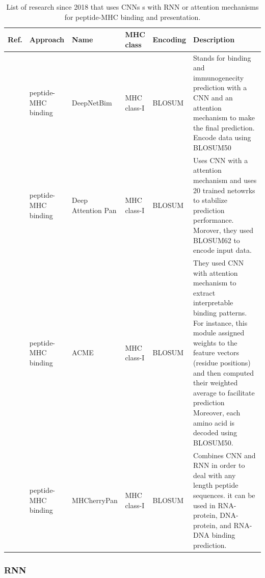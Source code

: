 \begin{table}[]
	\caption{List of research since 2018 that uses CNNs s with RNN or attention mechanisms for peptide-MHC binding and presentation.}
	\label{tab:cnn2}
	\setlength{\tabcolsep}{0.5em} %
	{\renewcommand{\arraystretch}{1.2}%
		
		\begin{tabular}{p{1.3cm}p{1.6cm}p{2cm}p{1.6cm}p{1.9cm}p{4cm}}
			\textbf{Ref.}                              & \textbf{Approach}   & \textbf{Name}    & \textbf{MHC class} & \textbf{Encoding} & \textbf{Description}                                            \\ \hline
			         \cite{yang2021deepnetbim} & peptide-MHC binding & DeepNetBim       & MHC class-I        & BLOSUM            & Stands for binding and immunogenecity prediction with a CNN and an attention mechanism to make the final prediction. Encode data using BLOSUM50         \\
			
			           \cite{jin2021deep}        & peptide-MHC binding & Deep Attention Pan & MHC class-I        & BLOSUM            & Uses CNN with a attention mechanism and uses 20 trained netowrks to stabilize prediction performance. Morover, they used BLOSUM62 to encode input data.            \\
			
			           \cite{hu2019acme}         & peptide-MHC binding & ACME             & MHC class-I        & BLOSUM     & They used CNN with attention mechanism to extract interpretable binding patterns. For instance, this module assigned  weights to the feature vectors (residue positions) and then computed their weighted average to facilitate prediction Moreover, each amino acid is decoded using BLOSUM50.  \\
			
			           \cite{xie2020mhcherrypan} & peptide-MHC binding & MHCherryPan      & MHC class-I        & BLOSUM            & Combines CNN and RNN in order to deal with any length peptide sequences. it can be used in RNA-protein, DNA-protein, and RNA-DNA binding prediction.      
		\end{tabular}
	}
\end{table}


\subsubsection{RNN}


